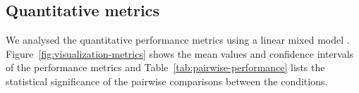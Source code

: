 



\subsection{Quantitative metrics}

We analysed the quantitative performance metrics using a linear mixed model \citep[p.~274]{Shalabh2009}.
Figure~\ref{fig:visualization-metrics} shows
the mean values and confidence intervals of the performance metrics and Table~\ref{tab:pairwise-performance} lists the
statistical significance of the pairwise comparisons between the conditions.

